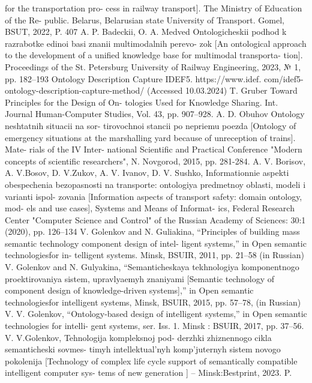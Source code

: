 \documentclass[a4paper]{article}
\begin{document}
\begin{multicols}{2}
\begin{thebibliography}{10}
for the transportation pro- cess in railway transport].
The Ministry of Education of the Re- public. Belarus,
Belarusian state University of Transport. Gomel,
BSUT, 2022, P. 407
 A. P. Badeckii, O. A. Medved Ontologicheskii podhod
k razrabotke edinoi basi znanii multimodalnih perevo-
zok [An ontological approach to the development of
a unified knowledge base for multimodal transporta-
tion]. Proceedings of the St. Petersburg University of
Railway Engineering, 2023, № 1, pp. 182–193
 Ontology Description Capture IDEF5. https://www.idef.
com/idef5-ontology-description-capture-method/
(Accessed 10.03.2024)
 T. Gruber Toward Principles for the Design of On-
tologies Used for Knowledge Sharing. Int. Journal
Human-Computer Studies, Vol. 43, pp. 907–928.
 A. D. Obuhov Ontology neshtatnih situacii na sor-
tirovochnoi stancii po nepriemu poezda [Ontology of
emergency situations at the marshalling yard because
of unreception of trains]. Mate- rials of the IV Inter-
national Scientific and Practical Conference "Modern
concepts of scientific researchers", N. Novgorod, 2015,
pp. 281-284.
 A. V. Borisov, A. V.Bosov, D. V.Zukov, A. V. Ivanov,
D. V. Sushko, Informationnie aspekti obespechenia
bezopasnosti na transporte: ontologiya predmetnoy
oblasti, modeli i varianti ispol- zovania [Information
aspects of transport safety: domain ontology, mod-
els and use cases], Systems and Means of Informat-
ics, Federal Research Center "Computer Science and
Control" of the Russian Academy of Sciences: 30:1
(2020), pp. 126–134
 V. Golenkov and N. Guliakina, “Principles of building
mass semantic technology component design of intel-
ligent systems,” in Open semantic technologiesfor in-
telligent systems. Minsk, BSUIR, 2011, pp. 21–58 (in
Russian)
 V. Golenkov and N. Gulyakina, “Semanticheskaya
tekhnologiya komponentnogo proektirovaniya sistem,
upravlyaemyh znaniyami [Semantic technology of
component design of knowledge-driven systems],” in
Open semantic technologiesfor intelligent systems,
Minsk, BSUIR, 2015, pp. 57–78, (in Russian)
 V. V. Golenkov, “Ontology-based design of intelligent
systems,” in Open semantic technologies for intelli-
gent systems, ser. Iss. 1. Minsk : BSUIR, 2017, pp.
37–56.
 V. V.Golenkov, Tehnologija kompleksnoj pod-
derzhki zhiznennogo cikla semanticheski sovmes-
timyh intellektual’nyh komp’juternyh sistem novogo
pokolenija [Technology of complex life cycle support
of semantically compatible intelligent computer sys-
tems of new generation ] – Minsk:Bestprint, 2023. P.

\end{thebibliography}
\end{multicols}
\end{document}
